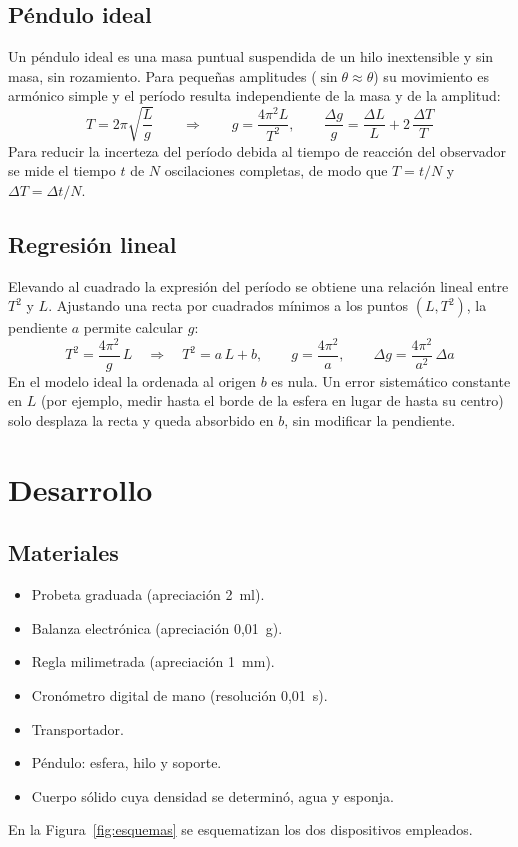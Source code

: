 \documentclass[12pt,a4paper]{article}
\begin{document}
\subsection{Péndulo ideal}
Un péndulo ideal es una masa puntual suspendida de un hilo inextensible y sin masa, sin
rozamiento. Para pequeñas amplitudes ($\sin\theta \approx \theta$) su movimiento es armónico
simple y el período resulta independiente de la masa y de la amplitud:
\[
  T = 2\pi\sqrt{\frac{L}{g}}
  \qquad\Rightarrow\qquad
  g = \frac{4\pi^2 L}{T^2},
  \qquad
  \frac{\Delta g}{g} = \frac{\Delta L}{L} + 2\,\frac{\Delta T}{T}
\]
Para reducir la incerteza del período debida al tiempo de reacción del observador se mide el
tiempo $t$ de $N$ oscilaciones completas, de modo que $T = t/N$ y $\Delta T = \Delta t / N$.

\subsection{Regresión lineal}
Elevando al cuadrado la expresión del período se obtiene una relación lineal entre $T^2$ y
$L$. Ajustando una recta por cuadrados mínimos a los puntos $(L, T^2)$, la pendiente $a$
permite calcular $g$:
\[
  T^2 = \frac{4\pi^2}{g}\,L \quad\Rightarrow\quad T^2 = a\,L + b, \qquad
  g = \frac{4\pi^2}{a}, \qquad \Delta g = \frac{4\pi^2}{a^2}\,\Delta a
\]
En el modelo ideal la ordenada al origen $b$ es nula. Un error sistemático constante en $L$
(por ejemplo, medir hasta el borde de la esfera en lugar de hasta su centro) solo desplaza la
recta y queda absorbido en $b$, sin modificar la pendiente.

\section{Desarrollo}

\subsection{Materiales}
\begin{itemize}
  \item Probeta graduada (apreciación 2~ml).
  \item Balanza electrónica (apreciación 0,01~g).
  \item Regla milimetrada (apreciación 1~mm).
  \item Cronómetro digital de mano (resolución 0,01~s).
  \item Transportador.
  \item Péndulo: esfera, hilo y soporte.
  \item Cuerpo sólido cuya densidad se determinó, agua y esponja.
\end{itemize}
En la Figura~\ref{fig:esquemas} se esquematizan los dos dispositivos empleados.
\end{document}
